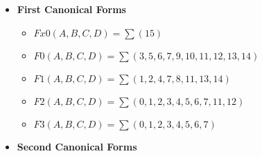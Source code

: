 \begin{itemize}
\begin{itemize}
        \item $F0(A,B,C,D) =  (X+Y+Z+W) . (X+Y+Z+\overline{W}) . (X+Y+\overline{Z}+W) . (X+\overline{Y}+Z+W) . (\overline{X}+Y+Z+W) . (\overline{X}+\overline{Y}+\overline{Z}+\overline{W})$
    
        \item $F1(A,B,C,D) =  (X+Y+Z+W) . (X+Y+\overline{Z}+\overline{W}) . (X+\overline{Y}+Z+\overline{W}) . (X+\overline{Y}+\overline{Z}+W) . (\overline{X}+Y+Z+\overline{W}) . (\overline{X}+Y+\overline{Z}+W) . (\overline{X}+\overline{Y}+Z+W) . (\overline{X}+\overline{Y}+\overline{Z}+\overline{W})$
    
        \item $F2(A,B,C,D) =  (\overline{X}+Y+Z+W) . (\overline{X}+Y+Z+\overline{W}) . (\overline{X}+Y+\overline{Z}+W) . (\overline{X}+\overline{Y}+Z+\overline{W}) . (\overline{X}+\overline{Y}+\overline{Z}+W) . (\overline{X}+\overline{Y}+\overline{Z}+\overline{W})$
    
        \item $F3(A,B,C,D) =  (\overline{X}+Y+Z+W) . (\overline{X}+Y+Z+\overline{W}) . (\overline{X}+Y+\overline{Z}+W) . (\overline{X}+Y+\overline{Z}+\overline{W}) . (\overline{X}+\overline{Y}+Z+W) . (\overline{X}+\overline{Y}+Z+\overline{W}) . (\overline{X}+\overline{Y}+\overline{Z}+W) . (\overline{X}+\overline{Y}+\overline{Z}+\overline{W})$
    
    \end{itemize}

\item \textbf{First Canonical Forms }
    \begin{itemize}
    
        \item $Fx0(A,B,C,D) = \sum(15)$
    
        \item $F0(A,B,C,D) = \sum(3, 5, 6, 7, 9, 10, 11, 12, 13, 14)$
    
        \item $F1(A,B,C,D) = \sum(1, 2, 4, 7, 8, 11, 13, 14)$
    
        \item $F2(A,B,C,D) = \sum(0, 1, 2, 3, 4, 5, 6, 7, 11, 12)$
    
        \item $F3(A,B,C,D) = \sum(0, 1, 2, 3, 4, 5, 6, 7)$
    
    \end{itemize}

\item \textbf{Second Canonical Forms }
    \begin{itemize}
    

\end{itemize}
\end{itemize}
